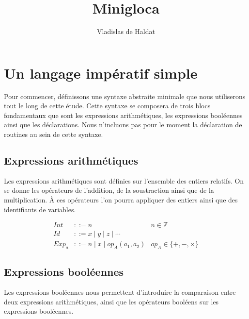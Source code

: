 \documentclass[a4paper, 12pt]{article}
\title{Minigloca}
\author{Vladislas de Haldat}
\begin{document}


\maketitle
\newpage
\tableofcontents
\newpage

\section{Un langage impératif simple}
Pour commencer, définissons une syntaxe abstraite minimale que nous utiliserons tout le long de cette étude.
Cette syntaxe se composera de trois blocs fondamentaux que sont les expressions arithmétiques, les expressions
booléennes ainsi que les déclarations. Nous n'incluons pas pour le moment la déclaration de routines au sein de cette syntaxe.

\subsection{Expressions arithmétiques}
Les expressions arithmétiques sont définies sur l'ensemble des entiers relatifs. On se donne les opérateurs
de l'addition, de la soustraction ainsi que de la multiplication. À ces opérateurs l'on pourra appliquer des
entiers ainsi que des identifiants de variables.


\begin{align*}
  Int   & ::= n                               & n \in \mathbb{Z}          \\
  Id    & ::= x \mid y \mid z \mid \cdots                                 \\
  Exp_a & ::= n \mid x \mid op_A(a_1, a_2) & op_A \in \{+, -, \times\}
\end{align*}

\subsection{Expressions booléennes}
Les expressions booléennes nous permettent d'introduire la comparaison entre deux expressions arithmétiques,
ainsi que les opérateurs booléens sur les expressions booléennes.
\end{document}
